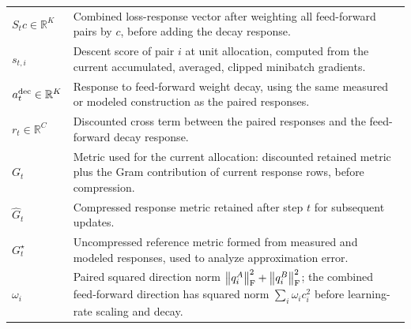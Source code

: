 \begin{table}[!htbp]
\begin{tabularx}{\linewidth}{@{}l >{\raggedright\arraybackslash}X@{}}
$S_tc\in\mathbb R^K$ & Combined loss-response vector after weighting
all feed-forward pairs by $c$, before adding the decay response.\\
$s_{t,i}$ & Descent score of pair $i$ at unit allocation, computed
from the current accumulated, averaged, clipped minibatch gradients.\\
\addlinespace[3pt]
$a_t^{\rm dec}\in\mathbb R^K$ & Response to feed-forward weight decay,
using the same measured or modeled construction as the paired responses.\\
$r_t\in\mathbb R^C$ & Discounted cross term between the paired responses
and the feed-forward decay response.\\
$G_t$ & Metric used for the current allocation: discounted retained
metric plus the Gram contribution of current response rows, before compression.\\
$\widehat G_t$ & Compressed response metric retained after step $t$
for subsequent updates.\\
$G_t^\star$ & Uncompressed reference metric formed from measured and
modeled responses, used to analyze approximation error.\\
$\omega_i$ & Paired squared direction norm
$\left\lVert q_i^A\right\rVert_{\mathrm F}^2+\left\lVert q_i^B\right\rVert_{\mathrm F}^2$; the combined feed-forward direction has squared
norm $\sum_i\omega_ic_i^2$ before learning-rate scaling and decay.\\
\bottomrule
\end{tabularx}
\end{table}

\clearpage


